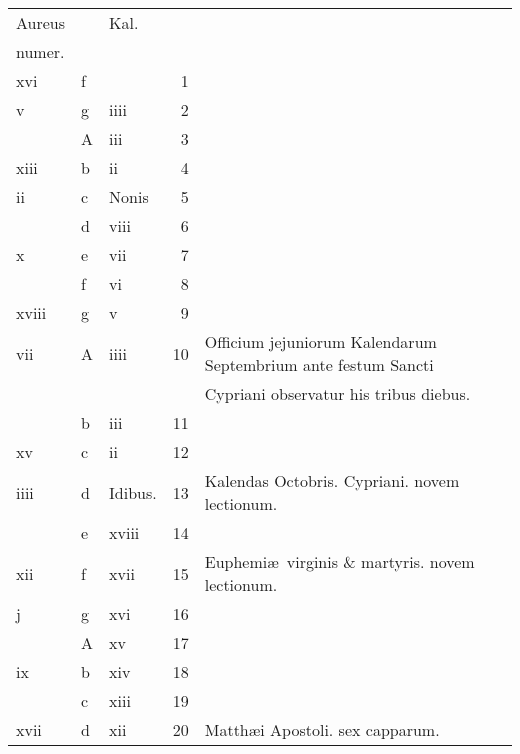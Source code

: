\documentclass[openany]{book}
\begin{document}
\begin{center}
\begin{tabular}{l | l | l | r | l r}
\color{Red}Aureus & & \color{Red} Kal. & & \color{Red} \\
\color{Red}numer. & & & & \color{Red} \\
\color{Red} xvi & f & & 1 & & \color{Red} \\
\color{Red} v & g & \color{Red} iiii & 2 & & \color{Red} \\
\color{Red}  & \color{Red} A & \color{Red} iii & 3 & & \color{Red} \\
\color{Red} xiii & b & \color{Red} ii & 4 & & \color{Red} \\
\color{Red} ii & c & Nonis & 5 & & \color{Red} \\
\color{Red}  & d & \color{Red} viii & 6 & & \color{Red} \\
\color{Red} x & e & \color{Red} vii & 7 & & \color{Red} \\
\color{Red}  & f & \color{Red} vi & 8 & & \color{Red} \\
\color{Red} xviii & g & \color{Red} v & 9 & & \color{Red} \\
\color{Red} vii & \color{Red} A & \color{Red} iiii & 10 & Officium jejuniorum Kalendarum Septembrium ante festum Sancti & \color{Red} \\
\color{Red}  & & & & \quad Cypriani observatur his tribus diebus. & \color{Red} \\
\color{Red}  & b & \color{Red} iii & 11 & & \color{Red} \\
\color{Red} xv & c & \color{Red} ii & 12 & & \color{Red} \\
\color{Red} iiii & d & Idibus. & 13 & \qquad \color{Red} Kalendas Octobris. \color{black} Cypriani. \color{Red} novem lectionum. & \color{Red} \\
\color{Red}  & e & \color{Red} xviii & 14 & & \color{Red} \\
\color{Red} xii & f & \color{Red} xvii & 15 & Euphemi\ae \ virginis \& martyris. \color{Red} novem lectionum. & \color{Red} \\
\color{Red} j & g & \color{Red} xvi & 16 & & \color{Red} \\
\color{Red}  & \color{Red} A & \color{Red} xv & 17 & & \color{Red} \\
\color{Red} ix & b & \color{Red} xiv & 18 & & \color{Red} \\
\color{Red}  & c & \color{Red} xiii & 19 & & \color{Red} \\
\color{Red} xvii & d & \color{Red} xii & 20 & \color{Red} Matth\ae i Apostoli. \color{black} sex capparum. & \color{Red} \\

\end{tabular}
\end{center}
\end{document}
